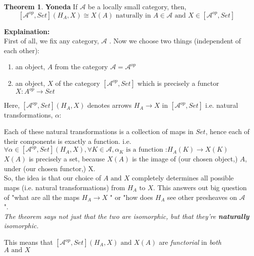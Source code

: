 \documentclass[18pt,a4paper]{extarticle}
\theoremstyle{definition}
\newtheorem{theorem}{Theorem}[section]
\theoremstyle{definition}
\begin{document}
\begin{theorem}{\textbf{Yoneda}} %
	If $\mathcal{A} $ be a locally small category, then, \\
	\[ [ \mathcal{A} ^{op},Set ](H_A,X) \cong X(A) \text{ naturally in } A \in \mathcal{A} \text{ and }
	X \in [ \mathcal{A}^{op},Set]\]
\end{theorem}
\textbf{Explaination:} \\
First of all, we fix any category, $\mathcal{A} $ . Now we choose two things (independent of each other):
\begin{enumerate}[label=\roman*]
	\item an object, $A$ from the category $ \mathcal{A}= \mathcal{A} ^{op} $
	\item an object, $X$ of the category $[ \mathcal{A}^{op},Set] $
		which is precisely a functor $X: A^{op} \rightarrow Set$
\end{enumerate}
Here, $[ \mathcal{A}^{op},Set](	H_A,X) $ denotes arrows $H_A \rightarrow X$ in $[ \mathcal{A}^{op},Set] $
i.e. natural transformations, $\alpha :$
Each of these natural transformations is a collection of maps in $Set$, hence each of their
components is exactly a function. i.e.
$\forall \alpha \in [ \mathcal{A}^{op},Set](H_A,X), \forall K \in \mathcal{A}, \alpha_K \text{ is a function :} H_A(K) \to X(K)$\\

$X(A)$ is precisely a set, because $X(A)$ is the image of (our chosen object,) $A$, under (our chosen functor,) X. \\

So, the idea is that our choice of $A \text{ and } X$ completely determines all possible maps
(i.e. natural transformations) from $H_A \text{ to } X$. This answers out big question of "what are all the maps
$H_A  \rightarrow X$ " or "how does $H_A$ see other presheaves on $\mathcal{A} $ ".\\

\textit{The theorem says not just that the two are isomorphic, but that they're \textbf{naturally} isomorphic.}

This means that $[ \mathcal{A}^{op},Set](H_A,X) \text{ and } X(A)$ are
\textit{functorial} in \textit{both} $A \text{ and } X$\\
\end{document}
